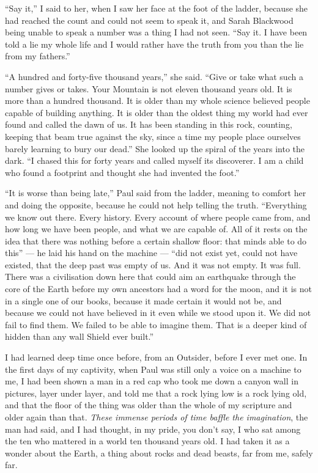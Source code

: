 ``Say it,'' I said to her, when I saw her face at the foot of the ladder, because she had reached the count and could not seem to speak it, and Sarah Blackwood being unable to speak a number was a thing I had not seen. ``Say it. I have been told a lie my whole life and I would rather have the truth from you than the lie from my fathers.''\par

``A hundred and forty-five thousand years,'' she said. ``Give or take what such a number gives or takes. Your Mountain is not eleven thousand years old. It is more than a hundred thousand. It is older than my whole science believed people capable of building anything. It is older than the oldest thing my world had ever found and called the dawn of us. It has been standing in this rock, counting, keeping that beam true against the sky, since a time my people place ourselves barely learning to bury our dead.'' She looked up the spiral of the years into the dark. ``I chased this for forty years and called myself its discoverer. I am a child who found a footprint and thought she had invented the foot.''\par

``It is worse than being late,'' Paul said from the ladder, meaning to comfort her and doing the opposite, because he could not help telling the truth. ``Everything we know out there. Every history. Every account of where people came from, and how long we have been people, and what we are capable of. All of it rests on the idea that there was nothing before a certain shallow floor: that minds able to do this'' --- he laid his hand on the machine --- ``did not exist yet, could not have existed, that the deep past was empty of us. And it was not empty. It was full. There was a civilisation down here that could aim an earthquake through the core of the Earth before my own ancestors had a word for the moon, and it is not in a single one of our books, because it made certain it would not be, and because we could not have believed in it even while we stood upon it. We did not fail to find them. We failed to be able to imagine them. That is a deeper kind of hidden than any wall Shield ever built.''\par

\ornament

I had learned deep time once before, from an Outsider, before I ever met one. In the first days of my captivity, when Paul was still only a voice on a machine to me, I had been shown a man in a red cap who took me down a canyon wall in pictures, layer under layer, and told me that a rock lying low is a rock lying old, and that the floor of the thing was older than the whole of my scripture and older again than that. \emph{These immense periods of time baffle the imagination}, the man had said, and I had thought, in my pride, you don't say, I who sat among the ten who mattered in a world ten thousand years old. I had taken it as a wonder about the Earth, a thing about rocks and dead beasts, far from me, safely far.\par

